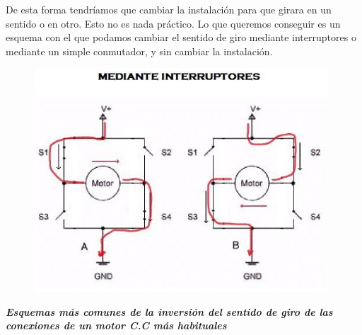 \documentclass[12pt]{article}
\begin{document}

\par

\begin{justify}
De esta forma tendríamos que cambiar la instalación para que girara en un sentido o en otro. Esto no es nada práctico. Lo que queremos conseguir es un esquema con el que podamos cambiar el sentido de giro mediante interruptores o mediante un simple conmutador, y sin cambiar la instalación.
\end{justify}\par




\begin{figure}[H]
	\begin{Center}
		\includegraphics[width=4.32in,height=3.29in]{./media/image3.png}
	\end{Center}
\end{figure}



\par

\begin{Center}
\textbf{\textit{Esquemas más comunes de la inversión del sentido de giro de las conexiones de un motor C.C más habituales}}
\end{Center}\par



\end{document}
